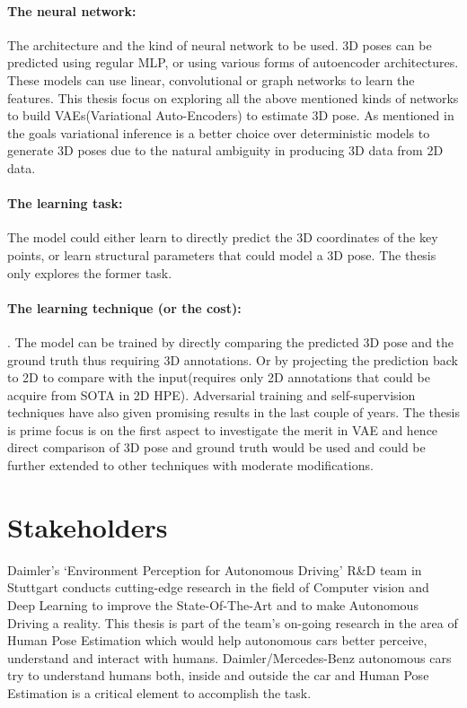 \paragraph{The neural network:} The architecture and the kind of neural network to be used. 3D poses can be predicted using regular MLP, or using various forms of autoencoder architectures. These models can use linear, convolutional or graph networks to learn the features. This thesis focus on exploring all the above mentioned kinds of networks to build VAEs(Variational Auto-Encoders) to estimate 3D pose. As mentioned in the goals variational inference is a better choice over deterministic models to generate 3D poses due to the natural ambiguity in producing 3D data from 2D data.  

\paragraph{The learning task:} The model could either learn to directly predict the 3D coordinates of the key points, or learn structural parameters that could model a 3D pose. The thesis only explores the former task.

\paragraph{The learning technique (or the cost):}. The model can be trained by directly comparing the predicted 3D pose and the ground truth thus requiring 3D annotations. Or by projecting the prediction back to 2D to compare with the input(requires only 2D annotations that could be acquire from SOTA in 2D HPE). Adversarial training and self-supervision techniques have also given promising results in the last couple of years. The thesis is prime focus is on the first aspect to investigate the merit in VAE and hence direct comparison of 3D pose and ground truth would be used and could be further extended to other techniques with moderate modifications.


\section{Stakeholders}
Daimler’s ‘Environment Perception for Autonomous Driving’ R&D team in Stuttgart conducts cutting-edge research in the field of Computer vision and Deep Learning to improve the State-Of-The-Art and to make Autonomous Driving a reality. This thesis is part of the team’s on-going research in the area of Human Pose Estimation which would help autonomous cars better perceive, understand and interact with humans. Daimler/Mercedes-Benz autonomous cars try to understand humans both, inside and outside the car and Human Pose Estimation is a critical element to accomplish the task.

